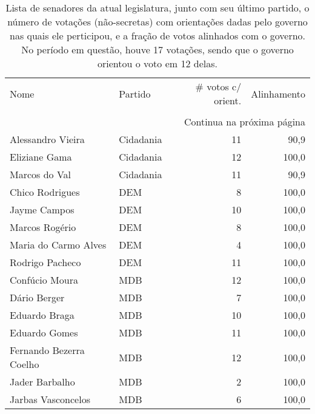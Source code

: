 \begin{longtable}{llrr}
  \caption{Lista de senadores da atual legislatura, junto com seu último partido,
    o número de votações (não-secretas) com orientações dadas pelo governo nas quais ele perticipou, e a fração de votos
  alinhados com o governo. No período em questão, houve 17 votações, sendo que o
  governo orientou o voto em 12 delas.}\\
\toprule
                    Nome &        Partido &  \# votos c/ orient. &  Alinhamento \\
                         &                &                     &              \\
\midrule
\endhead
\midrule
\multicolumn{4}{r}{{Continua na próxima página}} \\
\midrule
\endfoot

\bottomrule
\endlastfoot
       Alessandro Vieira &      Cidadania &                  11 &         90,9 \\
           Eliziane Gama &      Cidadania &                  12 &        100,0 \\
           Marcos do Val &      Cidadania &                  11 &         90,9 \\
         Chico Rodrigues &            DEM &                   8 &        100,0 \\
            Jayme Campos &            DEM &                  10 &        100,0 \\
          Marcos Rogério &            DEM &                   8 &        100,0 \\
    Maria do Carmo Alves &            DEM &                   4 &        100,0 \\
         Rodrigo Pacheco &            DEM &                  11 &        100,0 \\
          Confúcio Moura &            MDB &                  12 &        100,0 \\
            Dário Berger &            MDB &                   7 &        100,0 \\
           Eduardo Braga &            MDB &                  10 &        100,0 \\
           Eduardo Gomes &            MDB &                  11 &        100,0 \\
 Fernando Bezerra Coelho &            MDB &                  12 &        100,0 \\
          Jader Barbalho &            MDB &                   2 &        100,0 \\
      Jarbas Vasconcelos &            MDB &                   6 &        100,0 \\

\end{longtable}
